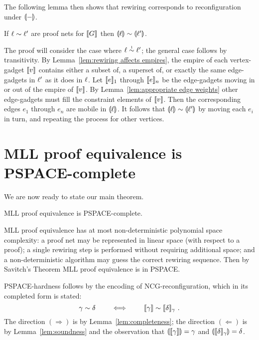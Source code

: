 \documentclass[conference]{IEEEtran}
\let\beforesection=\medskip
\let\aftersection=\noindent
\let\capsabbrev=\uppercase
\begin{document}
The following lemma then shows that rewiring corresponds to reconfiguration under $\llparenthesis-\rrparenthesis$.



\begin{lemma}
\label{lem:soundness}
If $\links\perm\links'$ are proof nets for $\llbracket G\rrbracket$ then $\coitn\links\perm\coitn{\links'}$.
\end{lemma}

\begin{IEEEproof}
The proof will consider the case where $\links\perm*\links'$; the general case follows by transitivity.
%
By Lemma~\ref{lem:rewiring affects empires}, the empire of each vertex-gadget $\llbracket v\rrbracket$ contains either a subset of, a superset of, or exactly the same edge-gadgets in $\ell'$ as it does in $\ell$.
%
Let $\llbracket e\rrbracket_1$ through $\llbracket e\rrbracket_n$ be the edge-gadgets moving in or out of the empire of $\llbracket v\rrbracket$.
%
By Lemma~\ref{lem:appropriate edge weights} other edge-gadgets must fill the constraint elements of $\llbracket v\rrbracket$.
%
Then the corresponding edges $e_1$ through $e_n$ are mobile in $\llparenthesis\ell\rrparenthesis$.
%
It follows that $\coitn\links\perm\coitn{\links'}$ by moving each $e_i$ in turn, and repeating the process for other vertices.
%
\end{IEEEproof}



\beforesection

\section{\capsabbrev{mll} proof equivalence is \capsabbrev{pspace}-complete}

\aftersection
%
We are now ready to state our main theorem.


\begin{theorem}
\capsabbrev{mll} proof equivalence is \capsabbrev{pspace}-complete.
\end{theorem}

\begin{IEEEproof}
\capsabbrev{mll} proof equivalence has at most non-deterministic polynomial space complexity: a proof net may be represented in linear space (with respect to a proof); a single rewiring step is performed without requiring additional space; and a non-deterministic algorithm may guess the correct rewiring sequence.
%
Then by Savitch's Theorem \cite{Savitch-1970} \capsabbrev{mll} proof equivalence is in \capsabbrev{pspace}.


\capsabbrev{pspace}-hardness follows by the encoding of \capsabbrev{ncg}-reconfiguration, which in its completed form is stated:
\[
	\gamma\perm\delta \qquad\iff\qquad \itn\gamma\perm\itn\delta_\gamma~.
\]
%
The direction $(\Rightarrow)$ is by Lemma~\ref{lem:completeness}; the direction $(\Leftarrow)$ is by Lemma~\ref{lem:soundness} and the observation that $\llparenthesis\llbracket\gamma\rrbracket\rrparenthesis=\gamma$ and $\llparenthesis\llbracket\delta\rrbracket_\gamma\rrparenthesis=\delta$.
%
\end{IEEEproof}





\end{document}
